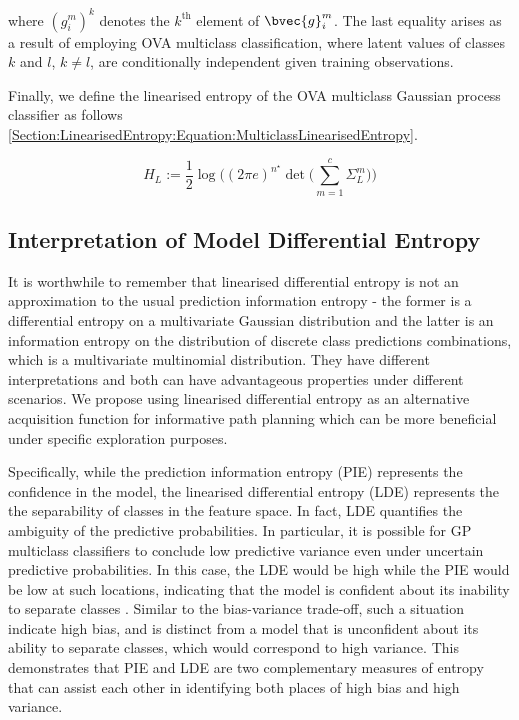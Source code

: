 				where $(g^{m}_{i})^{k}$ denotes the $k^{\text{th}}$ element of $\bvec{g}^{m}_{i}$. The last equality arises as a result of employing OVA multiclass classification, where latent values of classes $k$ and $l$, $k \neq l$, are conditionally independent given training observations.
				
				Finally, we define the linearised entropy of the OVA multiclass Gaussian process classifier as follows \eqref{Section:LinearisedEntropy:Equation:MulticlassLinearisedEntropy}.
				
				\begin{equation}
					H_{L} := \frac{1}{2} \log\Bigg((2 \pi e)^{n^{\star}} \det\bigg(\sum_{m = 1}^{c} \Sigma^{m}_{L}\bigg)\Bigg)
				\label{Section:LinearisedEntropy:Equation:MulticlassLinearisedEntropy}
				\end{equation}			
		
		\subsection{Interpretation of Model Differential Entropy}
		
			It is worthwhile to remember that linearised differential entropy is not an approximation to the usual prediction information entropy - the former is a differential entropy on a multivariate Gaussian distribution and the latter is an information entropy on the distribution of discrete class predictions combinations, which is a multivariate multinomial distribution. They have different interpretations and both can have advantageous properties under different scenarios. We propose using linearised differential entropy as an alternative acquisition function for informative path planning which can be more beneficial under specific exploration purposes.
			
			Specifically, while the prediction information entropy (PIE) represents the confidence in the model, the linearised differential entropy (LDE) represents the the separability of classes in the feature space. In fact, LDE quantifies the ambiguity of the predictive probabilities. In particular, it is possible for GP multiclass classifiers to conclude low predictive variance even under uncertain predictive probabilities. In this case, the LDE would be high while the PIE would be low at such locations, indicating that the model is confident about its inability to separate classes \cite{AsherBender}. Similar to the bias-variance trade-off, such a situation indicate high bias, and is distinct from a model that is unconfident about its ability to separate classes, which would correspond to high variance. This demonstrates that PIE and LDE are two complementary measures of entropy that can assist each other in identifying both places of high bias and high variance.
			
